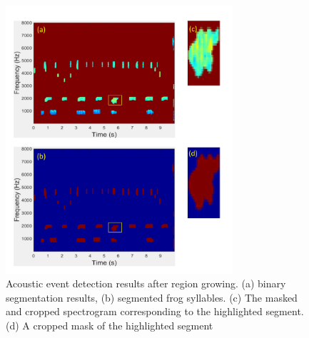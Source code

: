 
\begin{figure}[htb!]
\centering
\includegraphics[width=0.75\textwidth, height = 0.9\textwidth]{image/Ch6/contentShape.pdf}
\caption[Acoustic event detection results after region growing]{Acoustic event detection results after region growing. (a) binary segmentation results, (b) segmented frog syllables. (c) The masked and cropped spectrogram corresponding to the highlighted segment. (d) A cropped mask of the highlighted segment}
\label{fig:Ch6_AED}
\end{figure}






